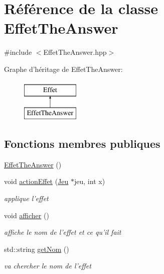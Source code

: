 \hypertarget{class_effet_the_answer}{\section{Référence de la classe Effet\-The\-Answer}
\label{class_effet_the_answer}
}


{\ttfamily \#include $<$Effet\-The\-Answer.\-hpp$>$}

Graphe d'héritage de Effet\-The\-Answer\-:\begin{figure}[H]
\begin{center}
\leavevmode
\includegraphics[height=2.000000cm]{class_effet_the_answer}
\end{center}
\end{figure}
\subsection*{Fonctions membres publiques}
\begin{DoxyCompactItemize}
\item 
\hyperlink{class_effet_the_answer_acf8e724a72d1bfc3c5dfe8e2467eff4b}{Effet\-The\-Answer} ()
\item 
void \hyperlink{class_effet_the_answer_a3e8f2cad127fdf393f1421eb04a6ebe8}{action\-Effet} (\hyperlink{class_jeu}{Jeu} $\ast$jeu, int x)
\begin{DoxyCompactList}\small\item\em applique l'effet \end{DoxyCompactList}\item 
void \hyperlink{class_effet_the_answer_a35ba2f942b38ffc60c9c64a763ba77b5}{afficher} ()
\begin{DoxyCompactList}\small\item\em affiche le nom de l'effet et ce qu'il fait \end{DoxyCompactList}\item 
std\-::string \hyperlink{class_effet_the_answer_a4438775df11e19a34226ac8f8b499961}{get\-Nom} ()
\begin{DoxyCompactList}\small\item\em va chercher le nom de l'effet \end{DoxyCompactList}\end{DoxyCompactItemize}


